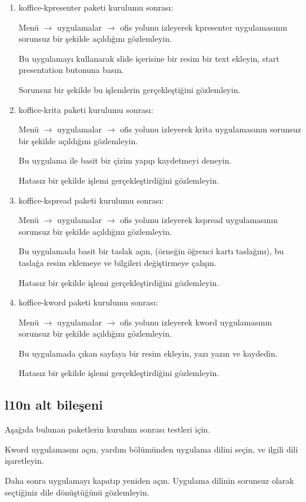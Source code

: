 \documentclass[a4paper,10pt]{article}
\begin{document}
\begin{enumerate}
\item koffice-kpresenter paketi kurulumu sonrası:

Menü $\rightarrow$ uygulamalar $\rightarrow$ ofis yolunu izleyerek kpresenter uygulamasının sorunsuz bir şekilde açıldığını gözlemleyin.

Bu uygulamayı kullanarak slide içerisine bir resim bir text ekleyin, start presentation butonuna basın.

Sorunsuz bir şekilde bu işlemlerin gerçekleştiğini gözlemleyin.

\item koffice-krita paketi kurulumu sonrası:

Menü $\rightarrow$ uygulamalar $\rightarrow$ ofis yolunu izleyerek krita uygulamasının sorunsuz bir şekilde açıldığını gözlemleyin.

Bu uygulama ile basit bir çizim yapıp kaydetmeyi deneyin.

Hatasız bir şekilde işlemi gerçekleştirdiğini gözlemleyin.

\item koffice-kspread paketi kurulumu sonrası:

Menü $\rightarrow$ uygulamalar $\rightarrow$ ofis yolunu izleyerek kspread uygulamasının sorunsuz bir şekilde açıldığını gözlemleyin.

Bu uygulamada basit bir taslak açın, (örneğin öğrenci kartı taslağını), bu taslağa resim eklemeye ve bilgileri değiştirmeye çalışın.

Hatasız bir şekilde işlemi gerçekleştirdiğini gözlemleyin.

\item koffice-kword paketi kurulumu sonrası:

Menü $\rightarrow$ uygulamalar $\rightarrow$ ofis yolunu izleyerek kword uygulamasının sorunsuz bir şekilde açıldığını gözlemleyin.

Bu uygulamada çıkan sayfaya bir resim ekleyin, yazı yazın ve kaydedin.

Hatasız bir şekilde işlemi gerçekleştirdiğini gözlemleyin.
\end{enumerate}
\subsection*{l10n alt bileşeni}
Aşağıda bulunan paketlerin kurulum sonrası testleri için. 

Kword uygulamasını açın, yardım bölümünden uygulama dilini seçin, ve ilgili dili işaretleyin. 

Daha sonra uygulamayı kapatıp yeniden açın. Uygulama dilinin sorunsuz olarak seçtiğiniz dile dönüştüğünü gözlemleyin.
\end{document}
